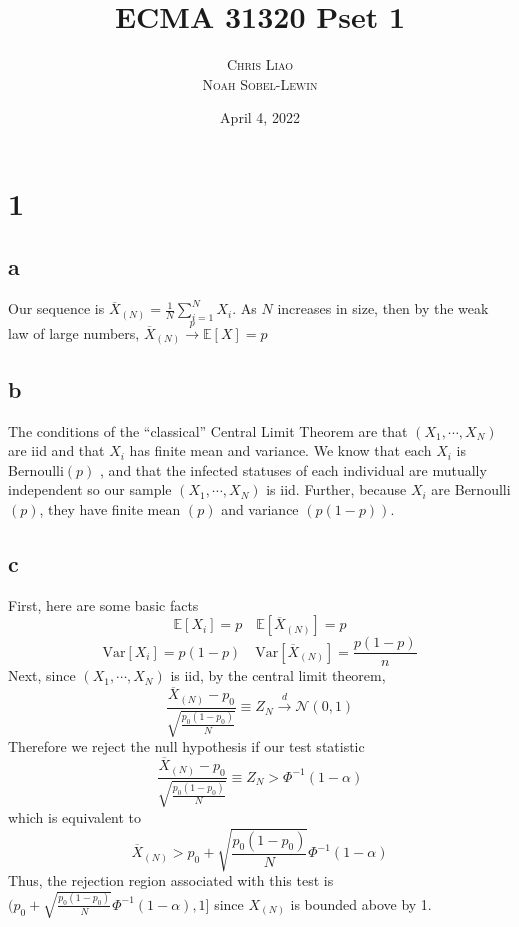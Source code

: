 \documentclass[12pt,notitlepage]{article}
\newcommand{\E}{\mathbb{E}}
\newcommand{\N}{\mathcal{N}}
\newcommand{\Var}{\mathrm{Var}}
\begin{document}
	
	\title{ECMA 31320 Pset 1}
	\author{\textsc{Chris Liao} \\ \textsc{Noah Sobel-Lewin}}
	\date{April 4, 2022}
	\maketitle
\section*{1}
\subsection*{a}
Our sequence is $\overline{X}_{(N)} = \frac{1}{N} \sum_{i=1}^N X_i$. As $N$ increases in size, then by the weak law of large numbers, $\overline{X}_{(N)} \stackrel{p}{\to} \E[X] = p$
\subsection*{b}
The conditions of the ``classical'' Central Limit Theorem are that $(X_1, \cdots, X_N)$ are iid and that $X_i$ has finite mean and variance. We know that each $X_i$ is Bernoulli$(p)$ , and that the infected statuses of each individual are mutually independent so our sample $(X_1, \cdots, X_N)$ is iid. Further, because $X_i$ are Bernoulli$(p)$, they have finite mean $(p)$ and variance $(p(1-p))$. 
\subsection*{c}
First, here are some basic facts
\begin{equation}
    \E[X_i] = p \quad \E[\overline{X}_{(N)}] = p \nonumber
\end{equation}
\begin{equation}
    \Var[X_i] = p(1-p) \quad \Var[\overline{X}_{(N)}] = \frac{p(1-p)}{n} \nonumber
\end{equation}
Next, since  $(X_1, \cdots, X_N)$ is iid, by the central limit theorem,
\begin{equation*}
    \frac{\overline{X}_{(N)}-p_0}{\sqrt{\frac{p_0(1-p_0)}{N}}} \equiv Z_N \stackrel{d}{\to} \N(0,1)
\end{equation*}
Therefore we reject the null hypothesis if our test statistic 
\begin{equation*}
    \frac{\overline{X}_{(N)}-p_0}{\sqrt{\frac{p_0(1-p_0)}{N}}} \equiv Z_N > \Phi^{-1}(1-\alpha)
\end{equation*}
which is equivalent to
\begin{equation*}
    \overline{X}_{(N)} > p_0 + \sqrt{\frac{p_0(1-p_0)}{N}}\Phi^{-1}(1-\alpha)
\end{equation*}
Thus, the rejection region associated with this test is $(p_0 + \sqrt{\frac{p_0(1-p_0)}{N}}\Phi^{-1}(1-\alpha), 1]$ since $X_{(N)}$ is bounded above by 1.
\end{document}
